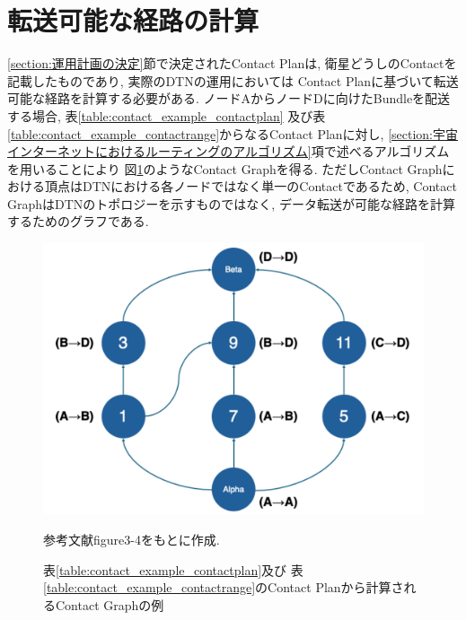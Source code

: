 \section{転送可能な経路の計算}
\label{section:経路決定}

\ref{section:運用計画の決定}節で決定されたContact Planは, 
衛星どうしのContactを記載したものであり, 実際のDTNの運用においては
Contact Planに基づいて転送可能な経路を計算する必要がある.  
ノードAからノードDに向けたBundleを配送する場合, 
表\ref{table:contact_example_contactplan}
及び表\ref{table:contact_example_contactrange}からなるContact Planに対し, 
\ref{section:宇宙インターネットにおけるルーティングのアルゴリズム}項で述べるアルゴリズムを用いることにより
図\ref{fig:contact_example_contactgraph}のようなContact Graphを得る.  
ただしContact Graphにおける頂点はDTNにおける各ノードではなく単一のContactであるため, 
Contact GraphはDTNのトポロジーを示すものではなく, データ転送が可能な経路を計算するためのグラフである.  

\begin{figure}[tbh]
    \centering
    \includegraphics[width=0.5\textheight]{img/contact_example_contactgraph.pdf}
    \caption{表\ref{table:contact_example_contactplan}及び
    表\ref{table:contact_example_contactrange}のContact Planから計算されるContact Graphの例}
    \label{fig:contact_example_contactgraph}
    \begin{minipage}{\textwidth}
        \centering
        \vspace{3mm}
        参考文献\cite{schedule_aware_bundle_routing}figure3-4をもとに作成.  
    \end{minipage}
\end{figure}
\label{chap:related_works}



